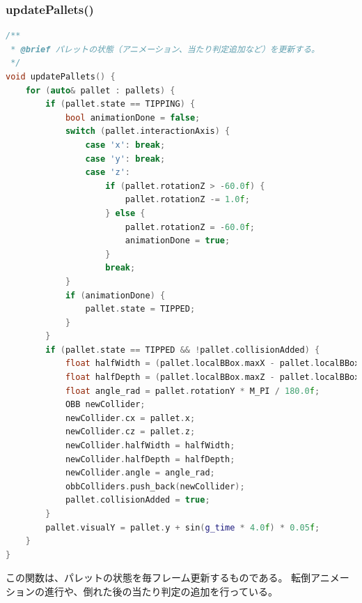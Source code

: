 \documentclass[uplatex,dvipdfmx,a4paper]{jsarticle}
\begin{document}
\hypertarget{func:updatePallets}{}\subsubsection{updatePallets()}\label{func:updatePallets}
\begin{lstlisting}[language=C++, caption={updatePallets() 関数}, label={lst:updatePallets_detail}]
/**
 * @brief パレットの状態（アニメーション、当たり判定追加など）を更新する。
 */
void updatePallets() {
    for (auto& pallet : pallets) {
        if (pallet.state == TIPPING) {
            bool animationDone = false;
            switch (pallet.interactionAxis) {
                case 'x': break;
                case 'y': break;
                case 'z':
                    if (pallet.rotationZ > -60.0f) {
                        pallet.rotationZ -= 1.0f;
                    } else {
                        pallet.rotationZ = -60.0f;
                        animationDone = true;
                    }
                    break;
            }
            if (animationDone) {
                pallet.state = TIPPED;
            }
        }
        if (pallet.state == TIPPED && !pallet.collisionAdded) {
            float halfWidth = (pallet.localBBox.maxX - pallet.localBBox.minX) * pallet.scale / 2.0f;
            float halfDepth = (pallet.localBBox.maxZ - pallet.localBBox.minZ) * pallet.scale / 2.0f;
            float angle_rad = pallet.rotationY * M_PI / 180.0f;
            OBB newCollider;
            newCollider.cx = pallet.x;
            newCollider.cz = pallet.z;
            newCollider.halfWidth = halfWidth;
            newCollider.halfDepth = halfDepth;
            newCollider.angle = angle_rad;
            obbColliders.push_back(newCollider);
            pallet.collisionAdded = true;
        }
        pallet.visualY = pallet.y + sin(g_time * 4.0f) * 0.05f;
    }
}
\end{lstlisting}
この関数は、パレットの状態を毎フレーム更新するものである。
転倒アニメーションの進行や、倒れた後の当たり判定の追加を行っている。
\end{document}
